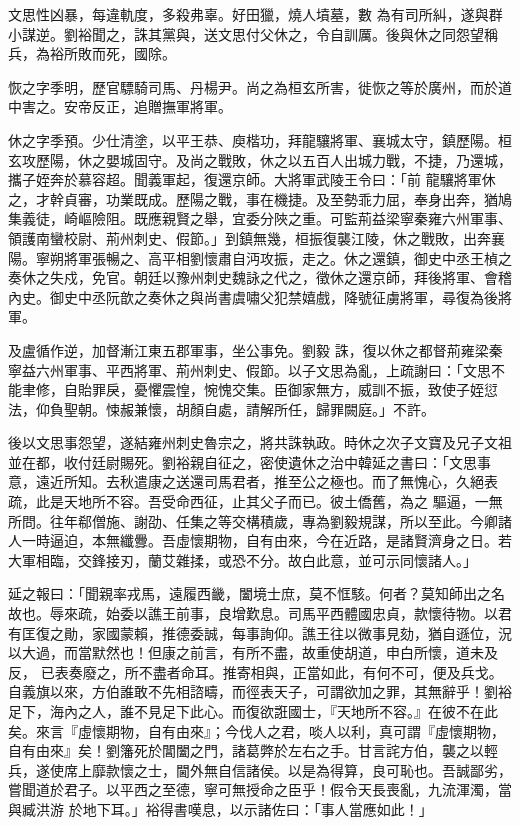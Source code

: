 \begin{pinyinscope}
 文思性凶暴，每違軌度，多殺弗辜。好田獵，燒人墳墓，數
 為有司所糾，遂與群小謀逆。劉裕聞之，誅其黨與，送文思付父休之，令自訓厲。後與休之同怨望稱兵，為裕所敗而死，國除。



 恢之字季明，歷官驃騎司馬、丹楊尹。尚之為桓玄所害，徙恢之等於廣州，而於道中害之。安帝反正，追贈撫軍將軍。



 休之字季預。少仕清塗，以平王恭、庾楷功，拜龍驤將軍、襄城太守，鎮歷陽。桓玄攻歷陽，休之嬰城固守。及尚之戰敗，休之以五百人出城力戰，不捷，乃還城，攜子姪奔於慕容超。聞義軍起，復還京師。大將軍武陵王令曰：「前
 龍驤將軍休之，才幹貞審，功業既成。歷陽之戰，事在機捷。及至勢乖力屈，奉身出奔，猶鳩集義徒，崎嶇險阻。既應親賢之舉，宜委分陜之重。可監荊益梁寧秦雍六州軍事、領護南蠻校尉、荊州刺史、假節。」到鎮無幾，桓振復襲江陵，休之戰敗，出奔襄陽。寧朔將軍張暢之、高平相劉懷肅自沔攻振，走之。休之還鎮，御史中丞王楨之奏休之失戍，免官。朝廷以豫州刺史魏詠之代之，徵休之還京師，拜後將軍、會稽內史。御史中丞阮歆之奏休之與尚書虞嘯父犯禁嬉戲，降號征虜將軍，尋復為後將軍。



 及盧循作逆，加督漸江東五郡軍事，坐公事免。劉毅
 誅，復以休之都督荊雍梁秦寧益六州軍事、平西將軍、荊州刺史、假節。以子文思為亂，上疏謝曰：「文思不能聿修，自貽罪戾，憂懼震惶，惋愧交集。臣御家無方，威訓不振，致使子姪愆法，仰負聖朝。悚赧兼懷，胡顏自處，請解所任，歸罪闕庭。」不許。



 後以文思事怨望，遂結雍州刺史魯宗之，將共誅執政。時休之次子文寶及兄子文祖並在都，收付廷尉賜死。劉裕親自征之，密使遺休之治中韓延之書曰：「文思事意，遠近所知。去秋遣康之送還司馬君者，推至公之極也。而了無愧心，久絕表疏，此是天地所不容。吾受命西征，止其父子而已。彼土僑舊，為之
 驅逼，一無所問。往年郗僧施、謝劭、任集之等交構積歲，專為劉毅規謀，所以至此。今卿諸人一時逼迫，本無纖釁。吾虛懷期物，自有由來，今在近路，是諸賢濟身之日。若大軍相臨，交鋒接刃，蘭艾雜揉，或恐不分。故白此意，並可示同懷諸人。」



 延之報曰：「聞親率戎馬，遠履西畿，闔境士庶，莫不恇駭。何者？莫知師出之名故也。辱來疏，始委以譙王前事，良增歎息。司馬平西體國忠貞，款懷待物。以君有匡復之勛，家國蒙賴，推德委誠，每事詢仰。譙王往以微事見劾，猶自遜位，況以大過，而當默然也！但康之前言，有所不盡，故重使胡道，申白所懷，道未及反，
 已表奏廢之，所不盡者命耳。推寄相與，正當如此，有何不可，便及兵戈。自義旗以來，方伯誰敢不先相諮疇，而徑表天子，可謂欲加之罪，其無辭乎！劉裕足下，海內之人，誰不見足下此心。而復欲誑國士，『天地所不容。』在彼不在此矣。來言『虛懷期物，自有由來』；今伐人之君，啖人以利，真可謂『虛懷期物，自有由來』矣！劉籓死於閶闔之門，諸葛弊於左右之手。甘言詫方伯，襲之以輕兵，遂使席上靡款懷之士，閫外無自信諸侯。以是為得算，良可恥也。吾誠鄙劣，嘗聞道於君子。以平西之至德，寧可無授命之臣乎！假令天長喪亂，九流渾濁，當與臧洪游
 於地下耳。」裕得書嘆息，以示諸佐曰：「事人當應如此！」




\end{pinyinscope}
